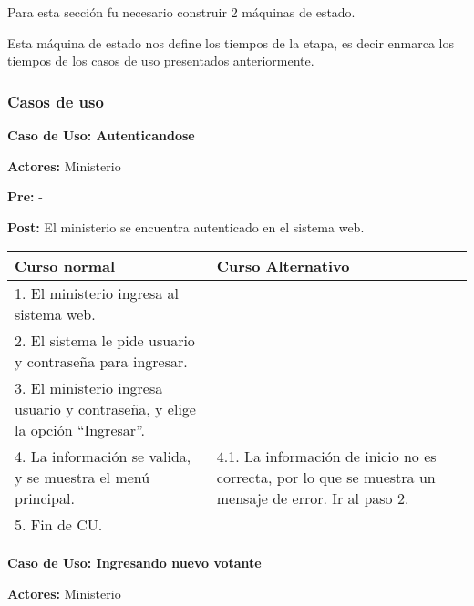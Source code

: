 Para esta sección fu necesario construir 2 máquinas de estado.

\begin{figure}[H]
\centering
\end{figure}

Esta máquina de estado nos define los tiempos de la etapa, es decir enmarca los tiempos de los casos de uso presentados anteriormente.

\begin{figure}[H]
\centering
\end{figure}


\subsubsection{Casos de uso}

\textbf{Caso de Uso: Autenticandose}

\textbf{Actores:} Ministerio

\textbf{Pre:} -

\textbf{Post:} El ministerio se encuentra autenticado en el sistema web.
\begin{table}[h!]
	
 \begin{tabular}{|p{7.5cm} | p{7.5cm}|} 
 \hline
 \textbf{Curso normal} & \textbf{Curso Alternativo} \\
 \hline
 1. El ministerio ingresa al sistema web. & \\
 \hline
 
 2. El sistema le pide usuario y contraseña para ingresar. & \\
 \hline 
 3. El ministerio ingresa usuario y contraseña, y elige la opción “Ingresar”. & \\
 \hline 
 4. La información se valida, y se muestra el menú principal. & 
4.1. La información de inicio no es correcta, por lo que se muestra un mensaje de error. Ir al paso 2.
\\
 \hline 
 5. Fin de CU. & \\

 \hline
 \end{tabular}

\end{table}


\textbf{Caso de Uso: Ingresando nuevo votante}

\textbf{Actores:} Ministerio

